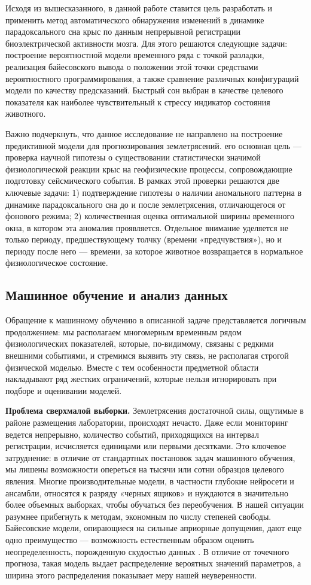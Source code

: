 \documentclass[14pt]{mmcs_article}
\begin{document}
Исходя из вышесказанного, в данной работе ставится цель разработать и применить метод автоматического обнаружения изменений в динамике парадоксального сна крыс по данным непрерывной регистрации биоэлектрической активности мозга. Для этого решаются следующие задачи: построение вероятностной модели временного ряда с точкой разладки, реализация байесовского вывода о положении этой точки средствами вероятностного программирования, а также сравнение различных конфигураций модели по качеству предсказаний. Быстрый сон выбран в качестве целевого показателя как наиболее чувствительный к стрессу индикатор состояния животного.

Важно подчеркнуть, что данное исследование не направлено на построение предиктивной модели для прогнозирования землетрясений. его основная цель — проверка научной гипотезы о существовании статистически значимой физиологической реакции крыс на геофизические процессы, сопровождающие подготовку сейсмического события. В рамках этой проверки решаются две ключевые задачи: 1) подтверждение гипотезы о наличии аномального паттерна в динамике парадоксального сна до и после землетрясения, отличающегося от фонового режима; 2) количественная оценка оптимальной ширины временного окна, в котором эта аномалия проявляется. Отдельное внимание уделяется не только периоду, предшествующему толчку (времени «предчувствия»), но и периоду после него — времени, за которое животное возвращается в нормальное физиологическое состояние.

\subsection*{Машинное обучение и анализ данных}
Обращение к машинному обучению в описанной задаче представляется логичным продолжением: мы располагаем многомерным временным рядом физиологических показателей, которые, по-видимому, связаны с редкими внешними событиями, и стремимся выявить эту связь, не располагая строгой физической моделью. Вместе с тем особенности предметной области накладывают ряд жестких ограничений, которые нельзя игнорировать при подборе и оценивании моделей.

\textbf{Проблема сверхмалой выборки.} Землетрясения достаточной силы, ощутимые в районе размещения лаборатории, происходят нечасто. Даже если мониторинг ведется непрерывно, количество событий, приходящихся на интервал регистрации, исчисляется единицами или первыми десятками. Это ключевое затруднение: в отличие от стандартных постановок задач машинного обучения, мы лишены возможности опереться на тысячи или сотни образцов целевого явления. Многие производительные модели, в частности глубокие нейросети и ансамбли, относятся к разряду «черных ящиков» \cite{AlanTuringInstitute} и нуждаются в значительно более объемных выборках, чтобы обучаться без переобучения. В нашей ситуации разумнее прибегнуть к методам, экономным по числу степеней свободы. Байесовские модели, опирающиеся на сильные априорные допущения, дают еще одно преимущество — возможность естественным образом оценить неопределенность, порожденную скудостью данных \cite{Sinkovec2022}. В отличие от точечного прогноза, такая модель выдает распределение вероятных значений параметров, а ширина этого распределения показывает меру нашей неуверенности.
\end{document}
